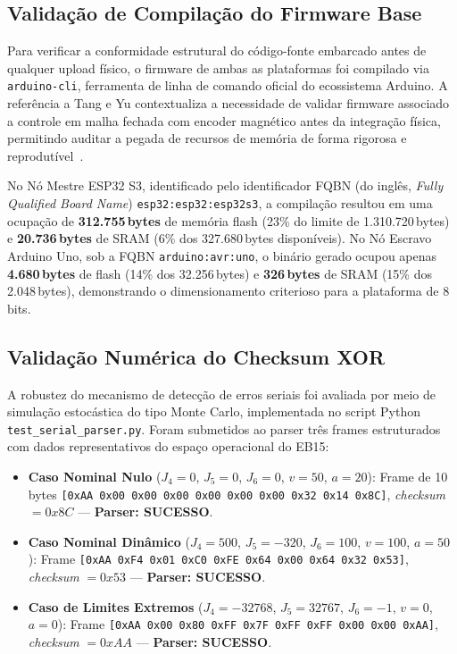 \subsection{Validação de Compilação do Firmware Base}
\label{subsec:dev_uart_compilacao}

Para verificar a conformidade estrutural do código-fonte embarcado antes de qualquer upload físico, o firmware de ambas as plataformas foi compilado via \texttt{arduino-cli}, ferramenta de linha de comando oficial do ecossistema Arduino. A referência a Tang e Yu contextualiza a necessidade de validar firmware associado a controle em malha fechada com encoder magnético antes da integração física, permitindo auditar a pegada de recursos de memória de forma rigorosa e reprodutível~\cite{tang2022research}.

No Nó Mestre ESP32 S3, identificado pelo identificador FQBN (do inglês, \textit{Fully Qualified Board Name}) \texttt{esp32:esp32:esp32s3}, a compilação resultou em uma ocupação de \textbf{312.755\,bytes} de memória flash (23\% do limite de 1.310.720\,bytes) e \textbf{20.736\,bytes} de SRAM (6\% dos 327.680\,bytes disponíveis). No Nó Escravo Arduino Uno, sob a FQBN \texttt{arduino:avr:uno}, o binário gerado ocupou apenas \textbf{4.680\,bytes} de flash (14\% dos 32.256\,bytes) e \textbf{326\,bytes} de SRAM (15\% dos 2.048\,bytes), demonstrando o dimensionamento criterioso para a plataforma de 8\,bits.

\subsection{Validação Numérica do Checksum XOR}
\label{subsec:dev_uart_checksum}

A robustez do mecanismo de detecção de erros seriais foi avaliada por meio de simulação estocástica do tipo Monte Carlo, implementada no script Python \texttt{test\_serial\_parser.py}. Foram submetidos ao parser três frames estruturados com dados representativos do espaço operacional do EB15:

\begin{itemize}
    \item \textbf{Caso Nominal Nulo} ($J_4 = 0$, $J_5 = 0$, $J_6 = 0$, $v = 50$, $a = 20$): Frame de 10 bytes \texttt{[0xAA~0x00~0x00~0x00~0x00~0x00~0x00~0x32~0x14~0x8C]}, \textit{checksum} $= 0x8C$ --- \textbf{Parser: SUCESSO}.
    \item \textbf{Caso Nominal Dinâmico} ($J_4 = 500$, $J_5 = -320$, $J_6 = 100$, $v = 100$, $a = 50$): Frame \texttt{[0xAA~0xF4~0x01~0xC0~0xFE~0x64~0x00~0x64~0x32~0x53]}, \textit{checksum} $= 0x53$ --- \textbf{Parser: SUCESSO}.
    \item \textbf{Caso de Limites Extremos} ($J_4 = -32768$, $J_5 = 32767$, $J_6 = -1$, $v = 0$, $a = 0$): Frame \texttt{[0xAA~0x00~0x80~0xFF~0x7F~0xFF~0xFF~0x00~0x00~0xAA]}, \textit{checksum} $= 0xAA$ --- \textbf{Parser: SUCESSO}.
\end{itemize}

